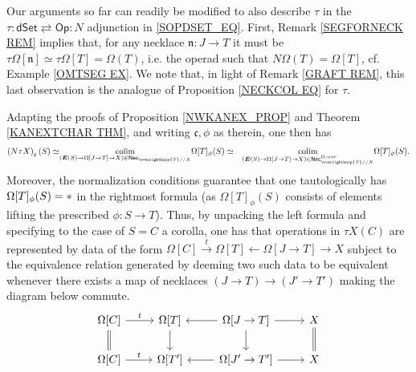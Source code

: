 \documentclass{hha}
\theoremstyle{definition} %
\newcommand{\vect}[1]{\text{\overrightharp{\ensuremath{#1}}}}
\newcommand{\Op}{\mathsf{Op}}
\newcommand{\dSet}{\mathsf{dSet}}
\DeclareMathOperator{\colim}{colim}
\begin{document}
\begin{remark}\label{TAUFUNEX REM}
	Our arguments so far can readily be modified 
	to also describe $\tau$ in the 
	$\tau \colon \dSet \rightleftarrows \Op \colon N$
	adjunction in \eqref{SOPDSET_EQ}.
	First, Remark \ref{SEGFORNECK REM} implies that,
	for any necklace 
	$\mathfrak{n} \colon J \to T$ it must be 
	$\tau \Omega[\mathfrak{n}] \simeq
	\tau \Omega[T] = \Omega(T)$,
	i.e. the operad such that $N\Omega(T) = \Omega[T]$,
	cf. Example \ref{OMTSEG EX}.
	We note that, in light of Remark \ref{GRAFT REM},
	this last observation is the analogue of 
	Proposition \ref{NECKCOL EQ} for $\tau$.
	
	Adapting the proofs of 
	Proposition \ref{NWKANEX_PROP} and
	Theorem \ref{KANEXTCHAR THM},
	and writing $\mathfrak{c},\phi$ as therein, one then has
\begin{equation}
\begin{aligned}
	\left(N \tau X\right)_{\mathfrak{c}}(S) 
	\simeq &
\underset{(\boldsymbol{E}(S) \to 
	\Omega[J \to T] \to X)
	\in \mathsf{Nec}_{\vect{S}//X}}{\colim}
	\Omega[T]_{\phi}(S)
	\simeq &
\underset{(\boldsymbol{E}(S) \to 
	\Omega[J \to T] \to X)
	\in \mathsf{Nec}^{\Omega,nor}_{\vect{S}//X}}{\colim}
	\Omega[T]_{\phi}(S).
\end{aligned}
\end{equation}
Moreover, the normalization conditions guarantee
that one tautologically has  
$\Omega[T]_{\phi}(S) = \**$
in the rightmost formula
(as $\Omega[T]_{\phi}(S)$ consists of elements lifting the prescribed $\phi\colon S \to T$).
Thus, by unpacking the left formula and specifying to the case of
$S=C$ a corolla,
one has that operations in
$\tau X(C)$
are represented by 
data of the form
$
	\Omega[C]
	\xrightarrow{t}
	\Omega[T]
	\leftarrow
	\Omega[J \to T]
	\to X
$
subject to the equivalence relation
generated by deeming two such data to be equivalent whenever there exists a map of necklaces
$(J \to T) \to (J' \to T')$
making the diagram below commute.
\[
\begin{tikzcd}
	\Omega[C] \ar{r}{t} \ar[equal]{d} &
	\Omega[T] \ar{d} &
	\Omega[J \to T] \ar{l} \ar{r} \ar{d} &
	X \ar[equal]{d}
\\
	\Omega[C] \ar{r}{t} &
	\Omega[T'] &
	\Omega[J' \to T'] \ar{l} \ar{r} &
	X
\end{tikzcd}
\]
\end{remark}
\end{document}
